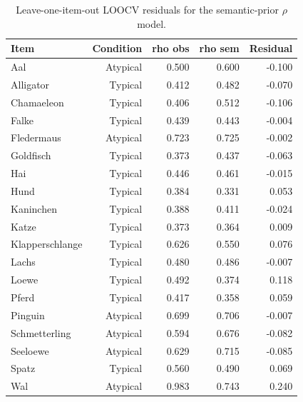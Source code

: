 \begin{table}[htbp]
\centering
\caption{Leave-one-item-out LOOCV residuals for the semantic-prior $\rho$ model.}
\label{tab:loocv-residuals}
\begin{tabular}{lrrrr}
\toprule
Item & Condition & rho obs & rho sem & Residual \\
\midrule
Aal & Atypical & 0.500 & 0.600 & -0.100 \\
Alligator & Typical & 0.412 & 0.482 & -0.070 \\
Chamaeleon & Typical & 0.406 & 0.512 & -0.106 \\
Falke & Typical & 0.439 & 0.443 & -0.004 \\
Fledermaus & Atypical & 0.723 & 0.725 & -0.002 \\
Goldfisch & Typical & 0.373 & 0.437 & -0.063 \\
Hai & Typical & 0.446 & 0.461 & -0.015 \\
Hund & Typical & 0.384 & 0.331 & 0.053 \\
Kaninchen & Typical & 0.388 & 0.411 & -0.024 \\
Katze & Typical & 0.373 & 0.364 & 0.009 \\
Klapperschlange & Typical & 0.626 & 0.550 & 0.076 \\
Lachs & Typical & 0.480 & 0.486 & -0.007 \\
Loewe & Typical & 0.492 & 0.374 & 0.118 \\
Pferd & Typical & 0.417 & 0.358 & 0.059 \\
Pinguin & Atypical & 0.699 & 0.706 & -0.007 \\
Schmetterling & Atypical & 0.594 & 0.676 & -0.082 \\
Seeloewe & Atypical & 0.629 & 0.715 & -0.085 \\
Spatz & Typical & 0.560 & 0.490 & 0.069 \\
Wal & Atypical & 0.983 & 0.743 & 0.240 \\
\bottomrule
\end{tabular}
\end{table}